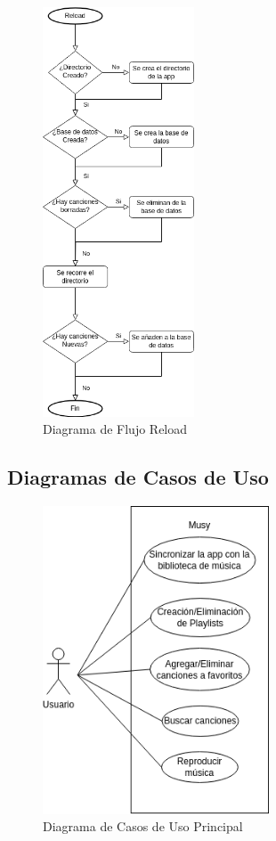 \documentclass[11pt, a4paper]{article}
\begin{document}
  \begin{figure}[H]
    \centering
    \includegraphics[width=0.4\textwidth]{media/Diagrama de Flujo 1.drawio.png}
    \caption{Diagrama de Flujo Reload}
    \label{fig:reload}
  \end{figure}

  \subsection{Diagramas de Casos de Uso}

  \begin{figure}[H]
    \centering
    \includegraphics[width=0.6\textwidth]{media/CasoUso1.drawio.png}
    \caption{Diagrama de Casos de Uso Principal}
    \label{fig:usecase}
  \end{figure}
\end{document}
